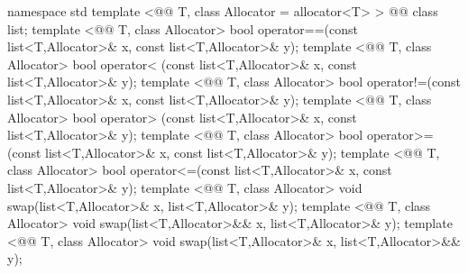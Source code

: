 \documentclass[american,twoside]{book}
\begin{document}
%

\begin{codeblock}
namespace std {
  template <@@ T, class Allocator = allocator<T> > 
    @@
    class list;
  template <@@ T, class Allocator>
    bool operator==(const list<T,Allocator>& x, const list<T,Allocator>& y);
  template <@@ T, class Allocator>
    bool operator< (const list<T,Allocator>& x, const list<T,Allocator>& y);
  template <@@ T, class Allocator>
    bool operator!=(const list<T,Allocator>& x, const list<T,Allocator>& y);
  template <@@ T, class Allocator>
    bool operator> (const list<T,Allocator>& x, const list<T,Allocator>& y);
  template <@@ T, class Allocator>
    bool operator>=(const list<T,Allocator>& x, const list<T,Allocator>& y);
  template <@@ T, class Allocator>
    bool operator<=(const list<T,Allocator>& x, const list<T,Allocator>& y);
  template <@@ T, class Allocator>
    void swap(list<T,Allocator>& x, list<T,Allocator>& y);
  template <@@ T, class Allocator>
    void swap(list<T,Allocator>&& x, list<T,Allocator>& y);
  template <@@ T, class Allocator>
    void swap(list<T,Allocator>& x, list<T,Allocator>&& y);
}
\end{codeblock}

%
\end{document}
